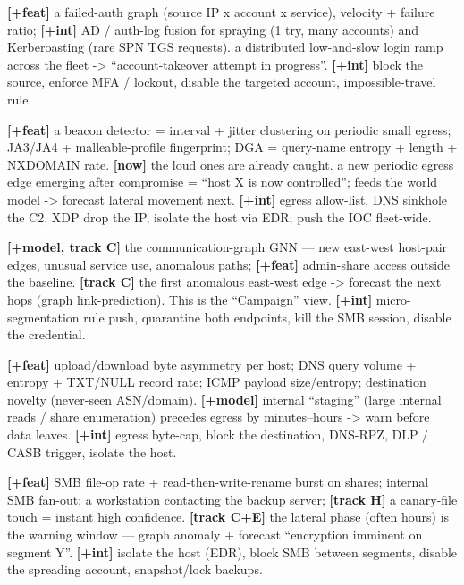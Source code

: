 \documentclass[11pt,a4paper]{article}
\begin{document}
{\textbf{[+feat]} a failed-auth graph (source IP x account x service), velocity + failure ratio; \textbf{[+int]} AD / auth-log fusion for spraying (1 try, many accounts) and Kerberoasting (rare SPN TGS requests).}
{a distributed low-and-slow login ramp across the fleet -> ``account-takeover attempt in progress''.}
{\textbf{[+int]} block the source, enforce MFA / lockout, disable the targeted account, impossible-travel rule.}

{\textbf{[+feat]} a beacon detector = interval + jitter clustering on periodic small egress; JA3/JA4 + malleable-profile fingerprint; DGA = query-name entropy + length + NXDOMAIN rate. \textbf{[now]} the loud ones are already caught.}
{a new periodic egress edge emerging after compromise = ``host X is now controlled''; feeds the world model -> forecast lateral movement next.}
{\textbf{[+int]} egress allow-list, DNS sinkhole the C2, XDP drop the IP, isolate the host via EDR; push the IOC fleet-wide.}

{\textbf{[+model, track C]} the communication-graph GNN --- new east-west host-pair edges, unusual service use, anomalous paths; \textbf{[+feat]} admin-share access outside the baseline.}
{\textbf{[track C]} the first anomalous east-west edge -> forecast the next hops (graph link-prediction). This is the ``Campaign'' view.}
{\textbf{[+int]} micro-segmentation rule push, quarantine both endpoints, kill the SMB session, disable the credential.}

{\textbf{[+feat]} upload/download byte asymmetry per host; DNS query volume + entropy + TXT/NULL record rate; ICMP payload size/entropy; destination novelty (never-seen ASN/domain).}
{\textbf{[+model]} internal ``staging'' (large internal reads / share enumeration) precedes egress by minutes--hours -> warn before data leaves.}
{\textbf{[+int]} egress byte-cap, block the destination, DNS-RPZ, DLP / CASB trigger, isolate the host.}

{\textbf{[+feat]} SMB file-op rate + read-then-write-rename burst on shares; internal SMB fan-out; a workstation contacting the backup server; \textbf{[track H]} a canary-file touch = instant high confidence.}
{\textbf{[track C+E]} the lateral phase (often hours) is the warning window --- graph anomaly + forecast ``encryption imminent on segment Y''.}
{\textbf{[+int]} isolate the host (EDR), block SMB between segments, disable the spreading account, snapshot/lock backups.}
\end{document}
